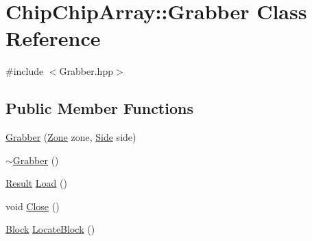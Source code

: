 \hypertarget{classChipChipArray_1_1Grabber}{\section{Chip\+Chip\+Array\+:\+:Grabber Class Reference}
\label{classChipChipArray_1_1Grabber}
}


{\ttfamily \#include $<$Grabber.\+hpp$>$}

\subsection*{Public Member Functions}
\begin{DoxyCompactItemize}
\item 
\hyperlink{classChipChipArray_1_1Grabber_a7333f40c135fbe92d59651f75032b4e7}{Grabber} (\hyperlink{definitions_8hpp_adbd1e7a33d3e1751c7b2aa2562d0ecb9}{Zone} zone, \hyperlink{definitions_8hpp_a03325a8a9d4f105db5e37dd587128142}{Side} side)
\item 
\hyperlink{classChipChipArray_1_1Grabber_a0fe4bfbb6e479006a584f50cac0b5d5d}{$\sim$\+Grabber} ()
\item 
\hyperlink{definitions_8hpp_ab84ebabb02540c4a7ec341a213abf1dc}{Result} \hyperlink{classChipChipArray_1_1Grabber_a56639f8f9ba9468bce4b6d69ceb2eb54}{Load} ()
\item 
void \hyperlink{classChipChipArray_1_1Grabber_aacf089ceb4aa5b263c2cc702fb3daf74}{Close} ()
\item 
\hyperlink{classChipChipArray_1_1Block}{Block} \hyperlink{classChipChipArray_1_1Grabber_a86bc18ecf71c7ff4e324df0467af124a}{Locate\+Block} ()
\end{DoxyCompactItemize}
